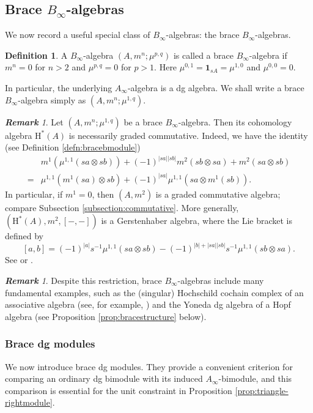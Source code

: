 \documentclass[a4paper, 11pt]{amsart}
\theoremstyle{definition}
\newtheorem{defn}[thm]{Definition}
\theoremstyle{remark}
\newtheorem{rem}[thm]{\bf Remark}
\numberwithin{equation}{section}
\newcommand{\id}{\mathbf{1}}
\begin{document}
\subsection{Brace $B_\infty$-algebras}
We now record a useful special class of $B_\infty$-algebras: the brace $B_\infty$-algebras.
\begin{defn}\label{defn:brace}
A $B_\infty$-algebra $(A,m^n;\mu^{p,q})$ is called a brace $B_\infty$-algebra if $m^n=0$ for $n>2$ and $\mu^{p,q}=0$ for $p>1$. Here $\mu^{0,1}=\id_{sA}=\mu^{1,0}$ and $\mu^{0,0}=0$.

In particular, the underlying $A_\infty$-algebra is a dg algebra. We shall write a brace $B_\infty$-algebra simply as $(A,m^n;\mu^{1,q})$.
\end{defn}


\begin{rem}\label{rem:commtativebrace}
Let $(A,m^n;\mu^{1,q})$ be a brace $B_\infty$-algebra. Then its cohomology algebra $\mathrm H^*(A)$ is necessarily graded commutative. Indeed, we have the identity (see Definition \ref{defn:bracebmodule})
 \begin{align*}
 & m^1(\mu^{1,1} (sa \otimes sb)) + (-1)^{|sa||sb|} m^2(sb \otimes sa) + m^2(sa \otimes sb) \\
 ={} & \mu^{1,1}(m^1(sa) \otimes sb) + (-1)^{|sa|} \mu^{1,1}(sa \otimes m^1(sb)).
 \end{align*}
In particular, if $m^1=0$, then $(A,m^2)$ is a graded commutative algebra; compare Subsection \ref{subsection:commutative}. More generally, $(\mathrm H^*(A),m^2,[-,-])$ is a Gerstenhaber algebra, where the Lie bracket is defined by $$[a, b]=(-1)^{|a|} s^{-1} \mu^{1,1}(sa \otimes sb) -(-1)^{|b|+|sa||sb|} s^{-1} \mu^{1,1}(sb \otimes sa).$$ 
See \cite[Lemma 5.18]{CLW} or \cite[Subsection 5.2]{GJ}.
\end{rem}

\begin{rem}
Despite this restriction, brace $B_\infty$-algebras include many fundamental examples, such as the (singular) Hochschild cochain complex of an associative algebra (see, for example, \cite{GeVo, LoVa, Vor, Wa}) and the Yoneda dg algebra of a Hopf algebra (see Proposition \ref{prop:bracestructure} below).
\end{rem}


\subsubsection{\textbf{\textup{Brace dg modules}}}
We now introduce brace dg modules. They provide a convenient criterion for comparing an ordinary dg bimodule with its induced $A_\infty$-bimodule, and this comparison is essential for the unit constraint in Proposition \ref{prop:triangle-rightmodule}.
\end{document}

